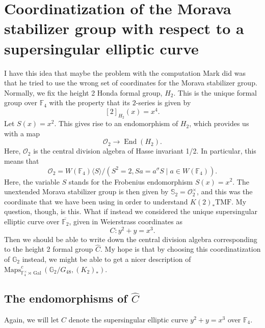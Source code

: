 \documentclass[12pt]{amsart}
\newcommand{\Maps}{\mathrm{Maps}}
\newcommand{\F}{\mathbb{F}}
\newcommand{\G}{\mathbb{G}}
\newcommand{\TMF}{\mathrm{TMF}}
\DeclareMathOperator{\Gal}{Gal}
\DeclareMathOperator{\End}{End}
\theoremstyle{definition}
\numberwithin{equation}{section}
\numberwithin{figure}{section}
\begin{document}
\section{Coordinatization of the Morava stabilizer group with respect to a supersingular elliptic curve}

I have this idea that maybe the problem with the computation Mark did was that he tried to use the wrong set of coordinates for the Morava stabilizer group. Normally, we fix the height 2 Honda formal group, $H_2$. This is the unique formal group over $\F_4$ with the property that its $2$-series is given by 
\[
[2]_{H_2}(x) = x^4.
\]
Let $S(x)=x^2$. This gives rise to an endomorphism of $H_2$, which provides us with a map
\[
\mathcal{O}_2 \to \End(H_2).
\]
Here, $\mathcal{O}_2$ is the central division algebra of Hasse invariant 1/2. In particular, this means that 
\[
\mathcal{O}_2 = W(\F_4)\langle S\rangle/(S^2=2, Sa = a^\sigma S\mid a\in W(\F_4)).
\]
Here, the variable $S$ stands for the Frobenius endomorphism $S(x) = x^2$. The unextended Morava stabilizer group is then given by $\mathbb{S}_2 = \mathcal{O}_2^\times$, and this was the coordinate that we have been using in order to understand $K(2)_*\TMF$. My question, though, is this. What if instead we considered the unique supersingular elliptic curve over $\overline{\F_2}$, given in Weierstrass coordinates as 
\[
C: y^2+y = x^3. 
\]
Then we should be able to write down the central division algebra corresponding to the height 2 formal group $\widehat{C}$.  My hope is that by choosing this coordinatization of $\G_2$ instead, we might be able to get a nicer description of $\Maps^c_{\F_4^\times \rtimes \Gal}(\G_2/G_{48},(K_2)_*)$.

\subsection{The endomorphisms of $\widehat{C}$}

Again, we will let $C$ denote the supersingular elliptic curve $y^2+y=x^3$ over $\F_4$.
\end{document}
